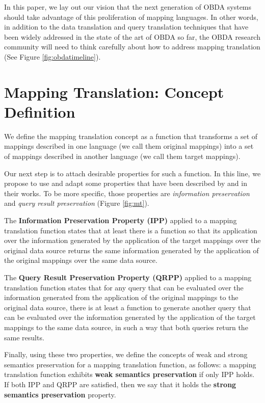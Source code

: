 In this paper, we lay out our vision that the next generation of OBDA systems should take advantage of this proliferation of mapping languages. In other words, in addition to the data translation and query translation techniques that have been widely addressed in the state of the art of OBDA so far, the OBDA research community will need to think carefully about how to address mapping translation (See Figure \ref{fig:obdatimeline}).


\section{Mapping Translation: Concept Definition}
We define the mapping translation concept as a function that transforms a set of mappings described in one language (we call them original mappings) into a set of mappings described in another language (we call them target mappings). 

Our next step is to attach desirable properties for such a function. In this line, we propose to use and adapt some properties that have been described by \citep{sequeda2012directly} and \citep{hartig2017foundations} in their works. To be more specific, those properties are \textit{information preservation} and \textit{query result preservation} (Figure \ref{fig:mt}).

The \textbf{Information Preservation Property (IPP)} applied to a mapping translation function states that at least there is a function so that its application over the information generated by the application of the target mappings over the original data source returns the same information generated by the application of the original mappings over the same data source.

The \textbf{Query Result Preservation Property (QRPP)} applied to a mapping translation function states that for any query that can be evaluated over the information generated from the application of the original mappings to the original data source, there is at least a function to generate another query that can be evaluated over the information generated by the application of the target mappings to the same data source, in such a way that both queries return the same results.


Finally, using these two properties, we define the concepts of weak and strong semantics preservation for a mapping translation function, as follows: a mapping translation function exhibits \textbf{weak semantics preservation} if only IPP holds. If both IPP and QRPP are satisfied, then we say that it holds the \textbf{strong semantics preservation} property.


